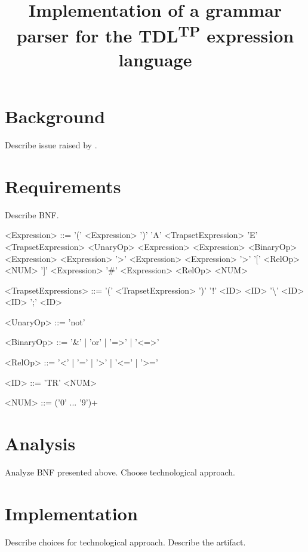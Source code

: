 \documentclass[12pt,oneside,a4paper,draft,notitlepage]{report}
\title{
	Implementation of a grammar parser for the TDL\textsuperscript{TP} expression language
}
\newcommand{\texttilde}{\raisebox{0.5ex}{\texttildelow}}
\begin{document}
	\maketitle

	\section*{Background}
	\par Describe issue raised by \cite{tdlarticle}.

	\section*{Requirements}
	\par Describe BNF.
	\begin{grammar}
		<Expression>	::=	'(' <Expression> ')'
		\alt 				'A' <TrapsetExpression>
		\alt 				'E' <TrapsetExpression>
		\alt 				<UnaryOp> <Expression>
		\alt 				<Expression> <BinaryOp> <Expression>
		\alt 				<Expression> '\texttilde\textgreater' <Expression>
		\alt 				<Expression> '\texttilde\textgreater' '[' <RelOp> <NUM> ']' <Expression>
		\alt 				'\#' <Expression> <RelOp> <NUM>

		<TrapsetExpressions>	::=	'(' <TrapsetExpression> ')'
		\alt						'!' <ID>
		\alt 						<ID> '\textbackslash' <ID>
		\alt						<ID> ';' <ID>

		<UnaryOp>	::= 'not'

		<BinaryOp>	::= '\&' | 'or' | '=\textgreater' | '\textless=\textgreater'

		<RelOp> 	::= '\textless' | '=' | '\textgreater' | '\textless=' | '\textgreater='

		<ID> 		::= 'TR' <NUM>

		<NUM> 		::= ('0' ... '9')+
	\end{grammar}

	\section*{Analysis}
	\par Analyze BNF presented above. Choose technological approach.

	\section*{Implementation}
	\par Describe choices for technological approach. Describe the artifact.

	\printbibliography[
		title=Sources
	]
\end{document}

